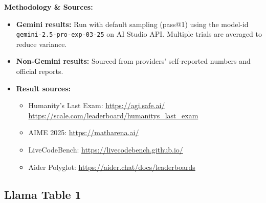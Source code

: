 \documentclass{article}
\begin{document}
\medskip

\textbf{Methodology \& Sources:}
\begin{itemize}
    \item \textbf{Gemini results:} Run with default sampling (pass@1) using the model-id \texttt{gemini-2.5-pro-exp-03-25} on AI Studio API. Multiple trials are averaged to reduce variance.
    \item \textbf{Non-Gemini results:} Sourced from providers’ self-reported numbers and official reports.
    \item \textbf{Result sources:}
          \begin{itemize}
              \item Humanity's Last Exam: \url{https://agi.safe.ai/} \textbar{} \url{https://scale.com/leaderboard/humanitys_last_exam}
              \item AIME 2025: \url{https://matharena.ai/}
              \item LiveCodeBench: \url{https://livecodebench.github.io/}
              \item Aider Polyglot: \url{https://aider.chat/docs/leaderboards}
          \end{itemize}
\end{itemize}

\bigskip

\subsection*{Llama Table 1}
\end{document}
